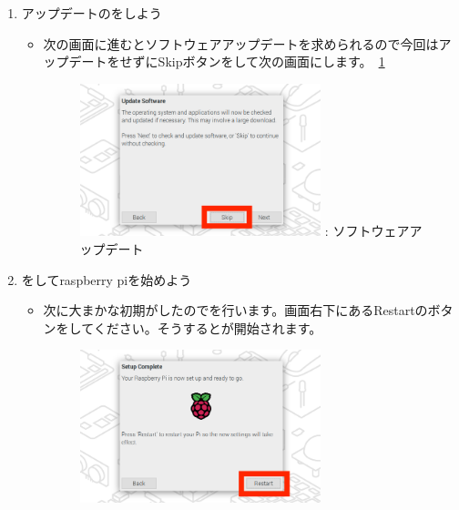 \documentclass[a4paper,12pt]{jarticle}
\begin{document}
\begin{enumerate}
\begin{itemize}
                \end{itemize}  
   \clearpage           
    \item
        アップデートのをしよう
                \begin{itemize}
                  \item
                      次の画面に進むとソフトウェアアップデートを求められるので今回はアップデートをせずにSkipボタンをして次の画面にします。~\ref{seq:refFigure18}
                      \begin{figure}[h]
                        \centering
                        \begin{minipage}{5.228cm}
                          {\upshape
                            \includegraphics[width=7.000cm]{sw_image07.png}
                            \newline
                            {\theFigure\label{seq:refFigure18}}:
                            ソフトウェアアップデート}
                        \end{minipage}
                      \end{figure}
                  \end{itemize}  
    \item
        をしてraspberry piを始めよう
                \begin{itemize}
                  \item
                        次に大まかな初期がしたのでを行います。画面右下にあるRestartのボタンをしてください。そうするとが開始されます。
                        \begin{figure}[h]
                          \centering
                          \begin{minipage}{5.228cm}
                            {\upshape
                              \includegraphics[width=7.000cm]{sw_image08.png}
}
\end{minipage}
\end{figure}
\end{itemize}
\end{enumerate}
\end{document}
